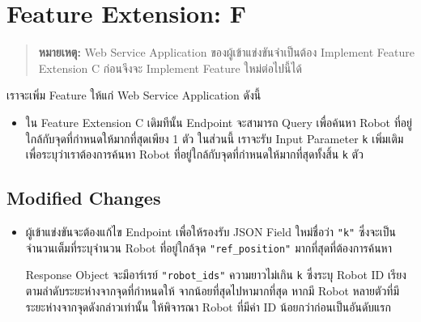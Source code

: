 
%                                                            

\section{Feature Extension: F}

\begin{quote}
  \footnotesize
  \textbf{หมายเหตุ:} Web Service Application ของผู้เข้าแข่งขันจำเป็นต้อง Implement Feature Extension C ก่อนจึงจะ Implement Feature ใหม่ต่อไปนี้ได้
\end{quote}

\noindent
เราจะเพิ่ม Feature ให้แก่ Web Service Application ดังนี้
\begin{itemize}[topsep=0pc,itemsep=0pc]
\item 
    ใน Feature Extension C เดิมทีนั้น Endpoint  จะสามารถ Query เพื่อค้นหา Robot ที่อยู่ใกล้กับจุดที่กำหนดให้มากที่สุดเพียง 1 ตัว \;
    ในส่วนนี้ เราจะรับ Input Parameter \lstinline{k} เพิ่มเติม เพื่อระบุว่าเราต้องการค้นหา Robot ที่อยู่ใกล้กับจุดที่กำหนดให้มากที่สุดทั้งสิ้น \lstinline{k} ตัว
\end{itemize}

\subsection{Modified Changes}

\begin{itemize}[parsep=0.5pc]
\item 
    ผู้เข้าแข่งขันจะต้องแก้ไข Endpoint  เพื่อให้รองรับ JSON Field ใหม่ชื่อว่า \lstinline{"k"} ซึ่งจะเป็นจำนวนเต็มที่ระบุจำนวน Robot ที่อยู่ใกล้จุด \lstinline{"ref_position"} มากที่สุดที่ต้องการค้นหา

    Response Object จะมีอาร์เรย์ \lstinline{"robot_ids"} ความยาวไม่เกิน \lstinline{k} ซึ่งระบุ Robot ID เรียงตามลำดับระยะห่างจากจุดที่กำหนดให้ จากน้อยที่สุดไปหามากที่สุด \;
    หากมี Robot หลายตัวที่มีระยะห่างจากจุดดังกล่าวเท่านั้น ให้พิจารณา Robot ที่มีค่า ID น้อยกว่าก่อนเป็นอันดับแรก
\end{itemize}

